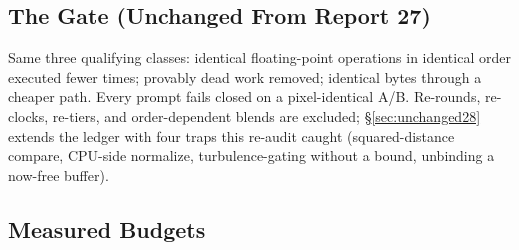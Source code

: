 \documentclass[11pt,a4paper]{article}
\begin{document}
\subsection{The Gate (Unchanged From Report 27)}
\label{sec:gate27}

Same three qualifying classes: identical floating-point operations in
identical order executed fewer times; provably dead work removed;
identical bytes through a cheaper path. Every prompt fails closed on a
pixel-identical A/B. Re-rounds, re-clocks, re-tiers, and order-dependent
blends are excluded; \S\ref{sec:unchanged28} extends the ledger with four
traps this re-audit caught (squared-distance compare, CPU-side normalize,
turbulence-gating without a bound, unbinding a now-free buffer).

\subsection{Measured Budgets}
\end{document}
